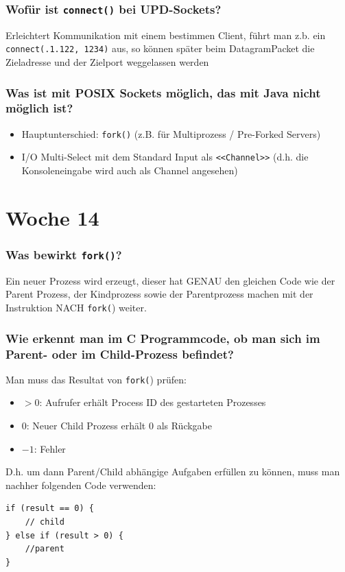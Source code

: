 \documentclass[10pt,a4paper]{scrartcl}
\begin{document}
\subsubsection{Wofür ist \texttt{connect()} bei UPD-Sockets?}

Erleichtert Kommunikation mit einem bestimmen Client, führt man z.b. ein
\texttt{connect(.1.122\dq , 1234)} aus, so können später beim DatagramPacket die
Zieladresse und der Zielport weggelassen werden

\subsubsection{Was ist mit POSIX Sockets möglich, das mit Java nicht möglich ist?}

\begin{itemize}
	\item Hauptunterschied: \texttt{fork()} (z.B. für Multiprozess / Pre-Forked Servers)
	\item I/O Multi-Select mit dem Standard Input als \texttt{<<Channel>>} (d.h. die Konsoleneingabe wird auch
		als Channel angesehen)
\end{itemize}


\section{Woche 14}

\subsubsection{Was bewirkt \texttt{fork()}?}

Ein neuer Prozess wird erzeugt, dieser hat GENAU den gleichen Code wie der Parent Prozess, der
Kindprozess sowie der Parentprozess machen mit der Instruktion NACH \texttt{fork(}) weiter.

\subsubsection{Wie erkennt man im C Programmcode, ob man sich im Parent- oder im Child-Prozess befindet?}

Man muss das Resultat von \texttt{fork(}) prüfen:
\begin{itemize}
	\item $>0$: Aufrufer erhält Process ID des gestarteten Prozesses
	\item $0$: Neuer Child Prozess erhält 0 als Rückgabe
	\item $-1$: Fehler
\end{itemize}

D.h. um dann Parent/Child abhängige Aufgaben erfüllen zu können, muss man nachher folgenden Code
verwenden:
\begin{verbatim}
if (result == 0) {
    // child
} else if (result > 0) {
    //parent
}
\end{verbatim}
\end{document}
